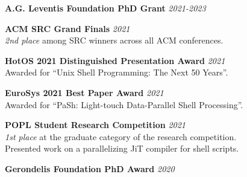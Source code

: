 \documentclass[margin]{res}
\begin{document}
\begin{resume}
\textbf{A.G. Leventis Foundation PhD Grant} \hfill {\em 2021-2023}

\textbf{ACM SRC Grand Finals} \hfill {\em 2021} \\
\textit{2nd place} among SRC winners across all ACM conferences.

\textbf{HotOS 2021 Distinguished Presentation Award} \hfill {\em 2021} \\
Awarded for ``Unix Shell Programming: The Next 50 Years''.

\textbf{EuroSys 2021 Best Paper Award} \hfill {\em 2021} \\
Awarded for ``PaSh: Light-touch Data-Parallel Shell Processing''.

\textbf{POPL Student Research Competition} \hfill {\em 2021} \\
\textit{1st place} at the graduate category of the research competition. \\
Presented work on a parallelizing JiT compiler for shell scripts. 

\textbf{Gerondelis Foundation PhD Award} \hfill {\em 2020}







\end{resume}
\end{document}
